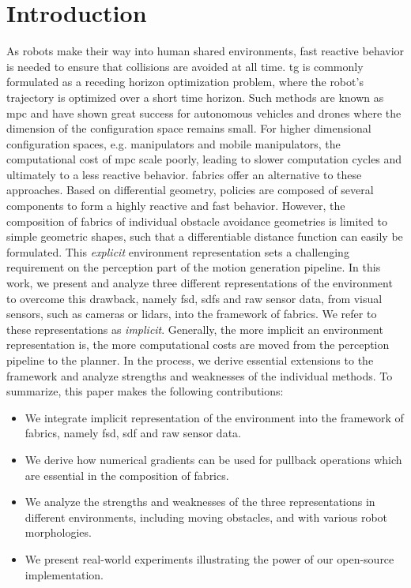 \section{Introduction}
\label{sec:ral24_intro}
%
As robots make their way into human shared environments,
fast reactive behavior is needed to ensure that collisions are avoided
at all time. \acf{tg} is commonly formulated as a receding
horizon optimization problem, where the robot's trajectory
is optimized over a short time horizon. Such methods are
known as \acf{mpc} and have shown great success for autonomous
vehicles and drones where the dimension of the configuration
space remains small. For higher dimensional
configuration spaces, e.g. manipulators and mobile
manipulators, the computational cost of \ac{mpc} scale
poorly, leading to slower computation cycles and ultimately
to a less reactive behavior. \acf{fabrics} offer an
alternative to these approaches. Based on differential
geometry, policies are composed of several components to form a highly reactive
and fast behavior. However, the composition of \ac{fabrics} of
individual obstacle avoidance geometries is limited to simple geometric shapes,
such that a differentiable distance function can easily be
formulated. This \textit{explicit} environment
representation
sets a challenging requirement on the perception part of the motion generation
pipeline.
%
%   
%
In this work, we present and analyze three
different representations of the environment to 
overcome this drawback, namely \acf{fsd}, 
\acfp{sdf} and raw sensor data, from visual sensors, such as
cameras or lidars, into the framework of
\ac{fabrics}. We refer to these representations as
\textit{implicit}.
Generally, the more implicit an environment representation is, the more
computational costs are moved from the perception pipeline to the planner.
In the process, we derive essential extensions to the framework and
analyze strengths and weaknesses of the individual methods. To summarize, this
paper makes the following contributions:
\begin{itemize}
  \item We integrate implicit representation of the environment into the
    framework of \ac{fabrics}, namely \ac{fsd}, \ac{sdf}
    and raw sensor data.
  \item We derive how numerical gradients can be used for pullback operations
    which are essential in the composition of \ac{fabrics}.
  \item We analyze the strengths and weaknesses of the three representations in
    different environments, including moving obstacles, and
    with various robot morphologies.
  \item We present real-world experiments illustrating the power of our
    open-source implementation.
\end{itemize}

